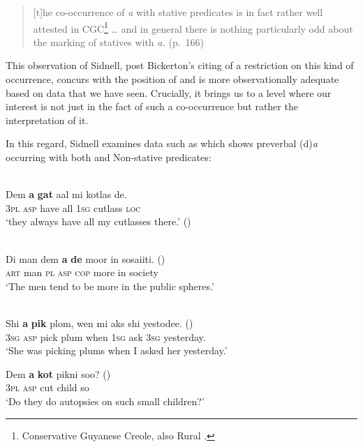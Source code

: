 \begin{quote}
[t]he co-occurrence of  \textit{a} with stative predicates
is in fact rather well attested in CGC\footnote{Conservative Guyanese
  Creole, also Rural .} … and in general there is nothing
particularly odd about the marking of statives with \textit{a.}
(p.~166)
\end{quote}

This observation of Sidnell, post Bickerton’s citing of a restriction
on this kind of occurrence, concurs with the position of
\citet{Jaganauth1987} and is more observationally adequate based on
data that we have seen. Crucially, it brings us to a level where our
interest is not just in the fact of such a co-occurrence but rather
the interpretation of it.

In this regard, Sidnell examines data such as   which shows
preverbal (d)\textit{a} occurring with both  and Non-stative
predicates:\largerpage[2]

\ea%
\label{ex:2:20}
\citet[165]{Sidnell2002}\\
\ea
  \gll Dem       \textbf{a} \textbf{gat}   aal         mi  kotlas          de.\\
\textsc{3pl}    \textsc{asp}        have   all \textsc{1sg} cutlass \textsc{loc} \\
\glt `they always have all my cutlasses there.' ()

\ex \citet[154]{Sidnell2002}\\
\gll    Di  man dem \textbf{a} \textbf{de}  moor in sosaiiti. ()\\
\textsc{art} man \textsc{pl} \textsc{asp} \textsc{cop} more in society\\

\glt `The men tend to be more in the public spheres.' \z \z


\ea%
\label{ex:2:21}
\citet[154]{Sidnell2002}\\

\ea
\gll Shi     \textbf{a} \textbf{pik} plom, wen  mi  aks  shi yestodee. ()\\
\textsc{3sg} \textsc{asp}       pick plum when \textsc{1sg} ask  \textsc{3sg} yesterday.\\
\glt `She was picking plums when I asked her yesterday.'

\ex
  \gll Dem   \textbf{a} \textbf{kot} pikni soo? ()\\
\textsc{3pl} \textsc{asp}      cut   child so\\
\glt `Do they do autopsies on such small children?'

